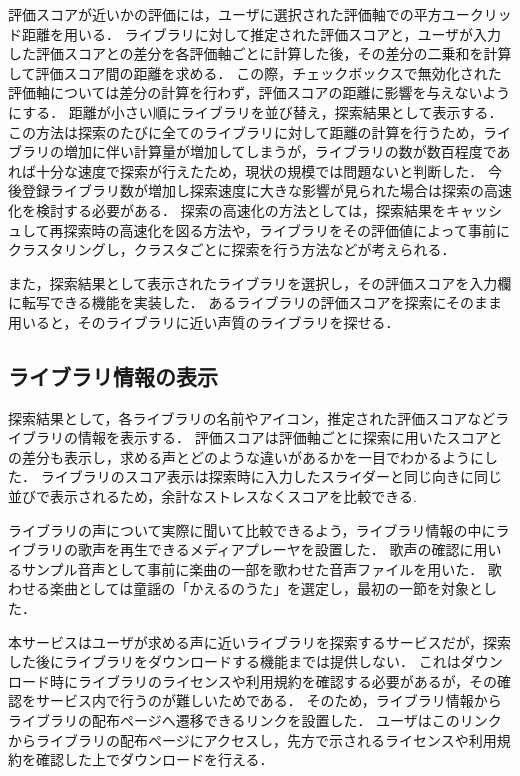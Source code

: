 評価スコアが近いかの評価には，ユーザに選択された評価軸での平方ユークリッド距離を用いる．
ライブラリに対して推定された評価スコアと，ユーザが入力した評価スコアとの差分を各評価軸ごとに計算した後，その差分の二乗和を計算して評価スコア間の距離を求める．
この際，チェックボックスで無効化された評価軸については差分の計算を行わず，評価スコアの距離に影響を与えないようにする．
距離が小さい順にライブラリを並び替え，探索結果として表示する．
この方法は探索のたびに全てのライブラリに対して距離の計算を行うため，ライブラリの増加に伴い計算量が増加してしまうが，ライブラリの数が数百程度であれば十分な速度で探索が行えたため，現状の規模では問題ないと判断した．
今後登録ライブラリ数が増加し探索速度に大きな影響が見られた場合は探索の高速化を検討する必要がある．
探索の高速化の方法としては，探索結果をキャッシュして再探索時の高速化を図る方法や，ライブラリをその評価値によって事前にクラスタリングし，クラスタごとに探索を行う方法などが考えられる．

また，探索結果として表示されたライブラリを選択し，その評価スコアを入力欄に転写できる機能を実装した．
あるライブラリの評価スコアを探索にそのまま用いると，そのライブラリに近い声質のライブラリを探せる．

\subsection{ライブラリ情報の表示}

探索結果として，各ライブラリの名前やアイコン，推定された評価スコアなどライブラリの情報を表示する．
評価スコアは評価軸ごとに探索に用いたスコアとの差分も表示し，求める声とどのような違いがあるかを一目でわかるようにした．
ライブラリのスコア表示は探索時に入力したスライダーと同じ向きに同じ並びで表示されるため，余計なストレスなくスコアを比較できる.

ライブラリの声について実際に聞いて比較できるよう，ライブラリ情報の中にライブラリの歌声を再生できるメディアプレーヤを設置した．
歌声の確認に用いるサンプル音声として事前に楽曲の一部を歌わせた音声ファイルを用いた．
歌わせる楽曲としては童謡の「かえるのうた」を選定し，最初の一節を対象とした．

本サービスはユーザが求める声に近いライブラリを探索するサービスだが，探索した後にライブラリをダウンロードする機能までは提供しない．
これはダウンロード時にライブラリのライセンスや利用規約を確認する必要があるが，その確認をサービス内で行うのが難しいためである．
そのため，ライブラリ情報からライブラリの配布ページへ遷移できるリンクを設置した．
ユーザはこのリンクからライブラリの配布ページにアクセスし，先方で示されるライセンスや利用規約を確認した上でダウンロードを行える．

